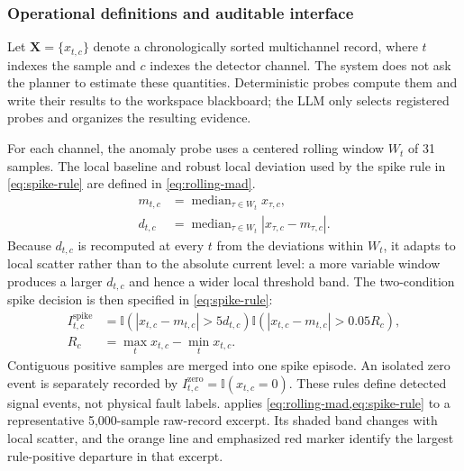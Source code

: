 
\subsubsection{Operational definitions and auditable interface}
\label{sec:operational-definitions}
Let $\mathbf{X}=\{x_{t,c}\}$ denote a chronologically sorted multichannel record, where $t$ indexes the sample and $c$ indexes the detector channel. The system does not ask the planner to estimate these quantities. Deterministic probes compute them and write their results to the workspace blackboard; the LLM only selects registered probes and organizes the resulting evidence.

For each channel, the anomaly probe uses a centered rolling window $W_t$ of 31 samples. The local baseline and robust local deviation used by the spike rule in \cref{eq:spike-rule} are defined in \cref{eq:rolling-mad}.
\begin{equation}
\begin{aligned}
m_{t,c}&=\operatorname{median}_{\tau\in W_t}x_{\tau,c},\\
d_{t,c}&=\operatorname{median}_{\tau\in W_t}\left|x_{\tau,c}-m_{\tau,c}\right|.
\end{aligned}
\label{eq:rolling-mad}
\end{equation}
Because $d_{t,c}$ is recomputed at every $t$ from the deviations within $W_t$, it adapts to local scatter rather than to the absolute current level: a more variable window produces a larger $d_{t,c}$ and hence a wider local threshold band. The two-condition spike decision is then specified in \cref{eq:spike-rule}:
\begin{equation}
\begin{aligned}
I^{\mathrm{spike}}_{t,c}&=
\mathbb{I}\left(\left|x_{t,c}-m_{t,c}\right|>5d_{t,c}\right)
\mathbb{I}\left(\left|x_{t,c}-m_{t,c}\right|>0.05R_c\right),\\
R_c&=\max_t x_{t,c}-\min_t x_{t,c}.
\end{aligned}
\label{eq:spike-rule}
\end{equation}
Contiguous positive samples are merged into one spike episode. An isolated zero event is separately recorded by $I^{\mathrm{zero}}_{t,c}=\mathbb{I}(x_{t,c}=0)$. These rules define detected signal events, not physical fault labels.  applies \cref{eq:rolling-mad,eq:spike-rule} to a representative 5,000-sample raw-record excerpt. Its shaded band changes with local scatter, and the orange line and emphasized red marker identify the largest rule-positive departure in that excerpt.

